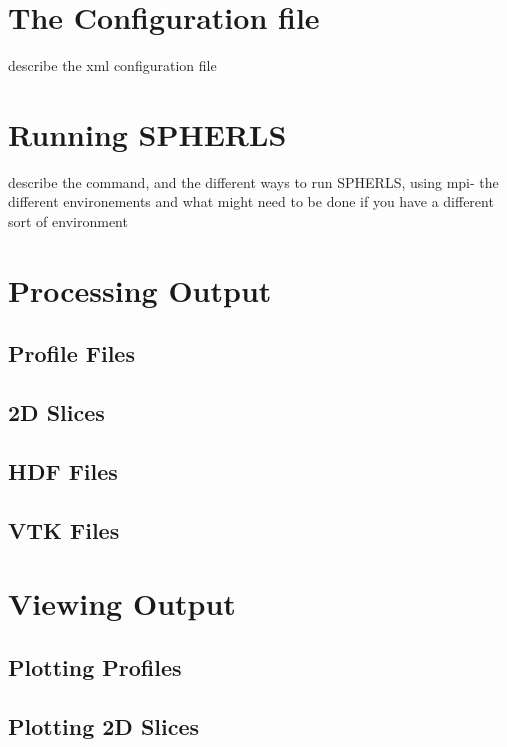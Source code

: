 \documentclass[12pt,a4paper]{book}
\begin{document}
\section{The Configuration file}
describe the xml configuration file
\section{Running SPHERLS}
describe the command, and the different ways to run SPHERLS, using mpi- the different environements and what might need to be done if you have a different sort of environment
\section{Processing Output}
\subsection{Profile Files}
\subsection{2D Slices}
\subsection{HDF Files}
\subsection{VTK Files}
\section{Viewing Output}
\subsection{Plotting Profiles}
\subsection{Plotting 2D Slices}
\end{document}
